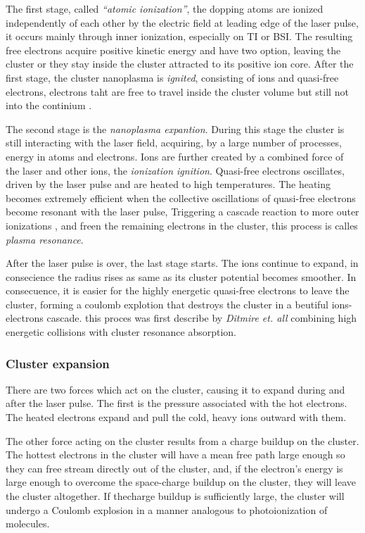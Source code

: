 The first stage, called \textit{“atomic ionization”}, the dopping atoms are ionized independently of each other by the electric field at leading edge of the laser pulse, it occurs mainly through inner ionization, especially on TI or BSI. The resulting free electrons acquire positive kinetic energy and have two option, leaving  the cluster or they stay inside the cluster attracted to its positive ion core. After the first stage, the cluster nanoplasma is \textit{ignited}, consisting of ions and quasi-free electrons, electrons taht are free to travel inside the cluster volume but still not into the continium \cite{last_quasiresonance_1999}. 


The second stage is the  \textit{nanoplasma expantion}. During this stage the cluster is still interacting with the laser field, acquiring, by a large number of processes, energy in atoms and electrons. Ions are further created by a combined force of the laser and other ions, the \textit{ionization ignition}\cite{gruner_femtosekundenspektroskopie_2013}. Quasi-free electrons oscillates, driven by the laser pulse and are heated to high temperatures. The heating becomes extremely efficient when the collective oscillations of quasi-free electrons become resonant with the laser pulse, Triggering a cascade reaction to more outer ionizations , and freen the remaining electrons in the cluster, this process is calles \textit{plasma resonance}\cite{saalmann_mechanisms_2006}.


After the laser pulse is over, the last stage starts. The ions continue to expand, in consecience the radius rises as same as its cluster potential becomes smoother. In consecuence, it is easier for the highly energetic quasi-free electrons to leave the cluster, forming a coulomb explotion that destroys the cluster in a beutiful ions-electrons cascade. this proces was first describe by \textit{Ditmire et. all} \cite{ditmire_interaction_1996} combining high energetic collisions with cluster resonance absorption.


\subsubsection{Cluster expansion}

There are two forces which act on the cluster, causing it to expand during and after the laser pulse. The first is the pressure associated with the hot electrons. The heated electrons expand and pull the cold, heavy ions outward with them.

The other force acting on the cluster results from a charge buildup on the cluster. The hottest electrons in the cluster will have a mean free path large enough so they can free stream directly out of the cluster, and, if the electron’s energy is large enough to overcome the space-charge buildup on the cluster, they will leave the cluster altogether. If thecharge buildup is sufficiently large, the cluster will undergo a Coulomb explosion in a manner analogous to photoionization
of molecules.




 

